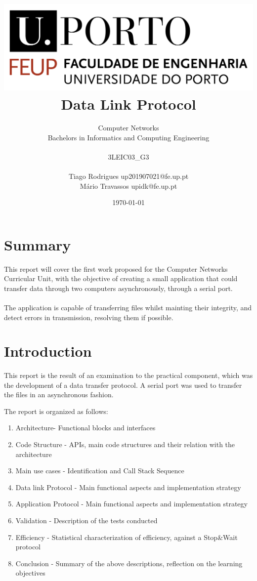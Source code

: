 \documentclass[11pt]{article}
\title{\includegraphics[scale=0.3]{logo.png} \\ \textbf{Data Link Protocol}}
\author{Computer Networks\\ Bachelors in Informatics and Computing Engineering \\ \\ 3LEIC03\_G3 \\ \\ Tiago Rodrigues up201907021@fe.up.pt \\ Mário Travassos upidk@fe.up.pt  }
\date{\today}
\begin{document}
\maketitle

\newpage

\section*{Summary}

\paragraph{}This report will cover the first work proposed for the Computer Networks Curricular Unit, with the objective of creating a small application that could transfer data through two computers asynchronously, through a serial port.

\paragraph{}The application is capable of transferring files whilst mainting their integrity, and detect errors in transmission, resolving them if possible.

\section*{Introduction}

\paragraph{}This report is the result of an examination to the practical component, which was the development of a data transfer protocol. A serial port was used to transfer the files in an asynchronous fashion.

The report is organized as follows:

\begin{enumerate}
  \item{Architecture- Functional blocks and interfaces}
  \item{Code Structure - APIs, main code structures and their relation with the architecture}
  \item{Main use cases - Identification and Call Stack Sequence}
  \item{Data link Protocol - Main functional aspects and implementation strategy}
  \item{Application Protocol - Main functional aspects and implementation strategy }
  \item{Validation - Description of the tests conducted}
  \item{Efficiency - Statistical characterization of efficiency, against a Stop\&Wait protocol}
  \item{Conclusion - Summary of the above descriptions, reflection on the learning objectives}
\end{enumerate}
\end{document}
